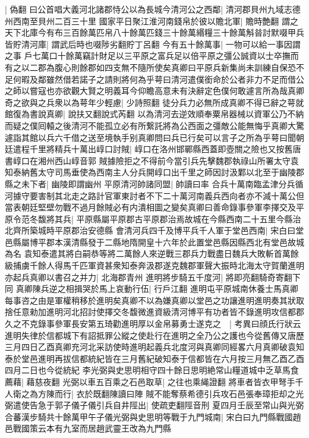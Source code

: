 |{
	偽翻}
曰公首唱大義河北諸郡恃公以為長城今清河公之西鄰|{
	清河郡貝州九域志德州西南至貝州二百三十里}
國家平日聚江淮河南錢帛於彼以贍北軍|{
	贍時艶翻}
謂之天下北庫今有布三百餘萬匹帛八十餘萬匹錢三十餘萬緡糧三十餘萬斛㫺討默啜甲兵皆貯清河庫|{
	謂武后時也啜陟劣翻貯丁呂翻}
今有五十餘萬事|{
	一物可以給一事因謂之事}
戶七萬口十餘萬竊計財足以三平原之富兵足以倍平原之彊公誠資以士卒撫而有之以二郡為腹心則餘郡如四支無不隨所使矣真卿曰平原兵新集尚未訓練自保恐不足何暇及鄰雖然借若諾子之請則將何為乎萼曰清河遣僕銜命於公者非力不足而借公之師以嘗寇也亦欲觀大賢之明義耳今仰瞻高意未有決辭定色僕何敢遽言所為哉真卿奇之欲與之兵衆以為萼年少輕慮|{
	少詩照翻}
徒分兵力必無所成真卿不得已辭之萼就館復為書說真卿|{
	說扶又翻說式芮翻}
以為清河去逆效順奉粟帛器械以資軍公乃不納而疑之僕囘轅之後清河不能孤立必有所繋託將為公西面之彊敵公能無悔乎真卿大驚遽詣其館以兵六千借之送至境執手别真卿問曰兵已行矣可以言子之所為乎萼曰聞朝廷遣程千里將精兵十萬出崞口討賊|{
	崞口在洛州邯鄲縣西蓋即壺關之險也又按舊唐書崞口在湘州西山崞音郭}
賊據險拒之不得前今當引兵先擊魏郡執祿山所署太守袁知泰納舊太守司馬垂使為西南主人分兵開崞口出千里之師因討汲鄴以北至于幽陵郡縣之未下者|{
	幽陵即謂幽州}
平原清河帥諸同盟|{
	帥讀曰率}
合兵十萬南臨孟津分兵循河據守要害制其北走之路計官軍東討者不下二十萬河南義兵西向者亦不減十萬公但當表朝廷堅壁勿戰不過月餘賊必有内潰相圖之變矣真卿曰善命錄事參軍李擇交及平原令范冬馥將其兵|{
	平原縣屬平原郡古平原郡治焉故城在今縣西南二十五里今縣治北齊所築城時平原郡治安德縣}
會清河兵四千及博平兵千人軍于堂邑西南|{
	宋白曰堂邑縣屬博平郡本漢清縣發于二縣地隋開皇十六年於此置堂邑縣因縣西北有堂邑故城為名}
袁知泰遣其將白嗣恭等將二萬餘人來逆戰三郡兵力戰盡日魏兵大敗斬首萬餘級捕虜千餘人得馬千匹軍資甚衆知泰奔汲郡遂克魏郡軍聲大振時北海太守賀蘭進明亦起兵真卿以書召之并力|{
	北海郡青州}
進明將步騎五千度河|{
	將即亮翻騎奇寄翻下同}
真卿陳兵逆之相揖哭於馬上哀動行伍|{
	行戶江翻}
進明屯平原城南休養士馬真卿每事咨之由是軍權稍移於進明矣真卿不以為嫌真卿以堂邑之功讓進明進明奏其狀取捨任意勑加進明河北招討使擇交冬馥微進資級清河博平有功者皆不錄進明攻信都郡久之不克錄事參軍長安第五琦勸進明厚以金帛募勇士遂克之　|{
	考異曰顔氏行狀云進明失律於信都城下有詔抵罪公縱之使赴行在進明之全乃公之護也今從舊傳又唐歷三月四日乙酉真卿充河北采訪使時進明起義兵北度河與真卿同經畧六月真卿破袁知泰於堂邑進明再拔信都統紀皆在三月舊紀破知泰于信都皆在六月按三月無乙酉乙酉四月二日也今從統紀}
李光弼與史思明相守四十餘日思明絶常山糧道城中乏草馬食薦藉|{
	藉慈夜翻}
光弼以車五百乘之石邑取草|{
	之往也乘䋲證翻}
將車者皆衣甲弩手千人衛之為方陳而行|{
	衣於既翻陳讀曰陣}
賊不能奪蔡希德引兵攻石邑張奉璋拒却之光弼遣使告急于郭子儀子儀引兵自井陘出|{
	使疏吏翻陘音刑}
夏四月壬辰至常山與光弼合蕃漢步騎共十餘萬甲午子儀光弼與史思明等戰于九門城南|{
	宋白曰九門縣戰國趙邑戰國策云本有九室而居趙武靈王改為九門縣}
